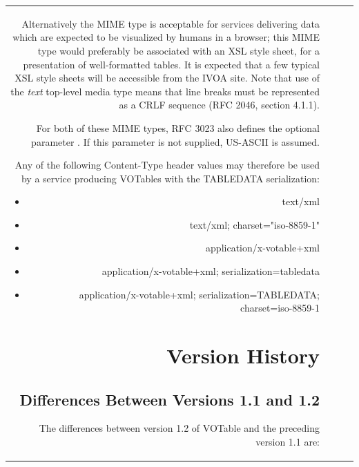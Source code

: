 \begin{tabular}{RRCp{0.8\textwidth}}
\begin{center}
{Alternatively the {} MIME type is acceptable
for services delivering data which are expected to be
visualized by humans in a browser; this MIME type 
would preferably be associated with an XSL style sheet,
for a presentation of well-formatted tables. It is expected
that a few typical XSL style sheets will be accessible from
the IVOA site.
Note that use of the {\em text} top-level media type means that
line breaks must be represented as a CRLF sequence
(RFC 2046, section 4.1.1).

For both of these MIME types, RFC 3023 also defines the optional
parameter {}.
If this parameter is not supplied, US-ASCII is assumed.

Any of the following Content-Type header values may therefore be used
by a service producing VOTables with the TABLEDATA serialization:
\begin{itemize}
  \item {\sf text/xml}
  \item {\sf text/xml; charset="iso-8859-1"}
  \item {\sf application/x-votable+xml}
  \item {\sf application/x-votable+xml; serialization=tabledata}
  \item {\sf application/x-votable+xml; serialization=TABLEDATA; charset=iso-8859-1}
\end{itemize}


\section{Version History}
\label{diff}

\subsection{Differences Between Versions 1.1 and 1.2}
\label{diff1.1-1.2}
The differences between version 1.2 of VOTable and the preceding
version 1.1 are:

}
\end{center}
\end{tabular}
